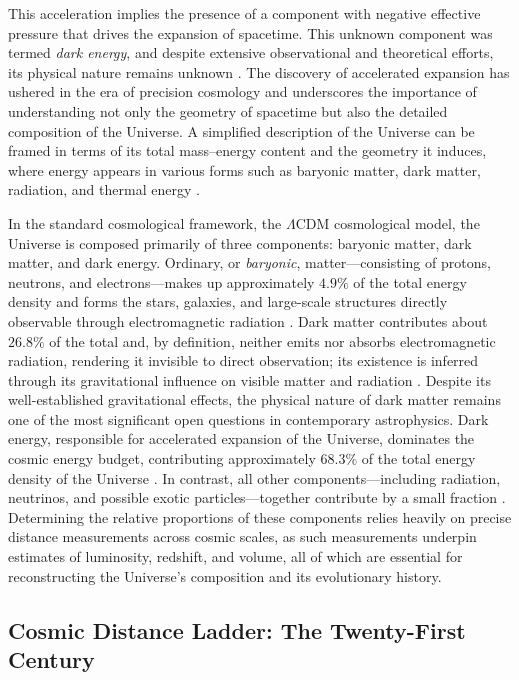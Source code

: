 This acceleration implies the presence of a component with negative effective pressure that drives the expansion of spacetime. This unknown component was termed \emph{dark energy}, and despite extensive observational and theoretical efforts, its physical nature remains unknown \citep{Riess1998, Perlmutter1999}. The discovery of accelerated expansion has ushered in the era of precision cosmology and underscores the importance of understanding not only the geometry of spacetime but also the detailed composition of the Universe. A simplified description of the Universe can be framed in terms of its total mass–energy content and the geometry it induces, where energy appears in various forms such as baryonic matter, dark matter, radiation, and thermal energy \citep{dodelson2003modern}.



In the standard cosmological framework, the $\Lambda$CDM cosmological model, the Universe is composed primarily of three components: baryonic matter, dark matter, and dark energy. Ordinary, or \emph{baryonic}, matter—consisting of protons, neutrons, and electrons—makes up approximately $4.9\%$ of the total energy density and forms the stars, galaxies, and large-scale structures directly observable through electromagnetic radiation \citep{2018planckVI}. Dark matter contributes about $26.8\%$ of the total and, by definition, neither emits nor absorbs electromagnetic radiation, rendering it invisible to direct observation; its existence is inferred through its gravitational influence on visible matter and radiation \citep{2018planckVI, Rubin1980}. Despite its well-established gravitational effects, the physical nature of dark matter remains one of the most significant open questions in contemporary astrophysics. Dark energy, responsible for accelerated expansion of the Universe, dominates the cosmic energy budget, contributing approximately $68.3\%$ of the total energy density of the Universe \citep{2018planckVI, Riess2018}. In contrast, all other components—including radiation, neutrinos, and possible exotic particles—together contribute by a small fraction \citep{2018planckVI}. Determining the relative proportions of these components relies heavily on precise distance measurements across cosmic scales, as such measurements underpin estimates of luminosity, redshift, and volume, all of which are essential for reconstructing the Universe’s composition and its evolutionary history.

\subsection{Cosmic Distance Ladder: The Twenty-First Century}

